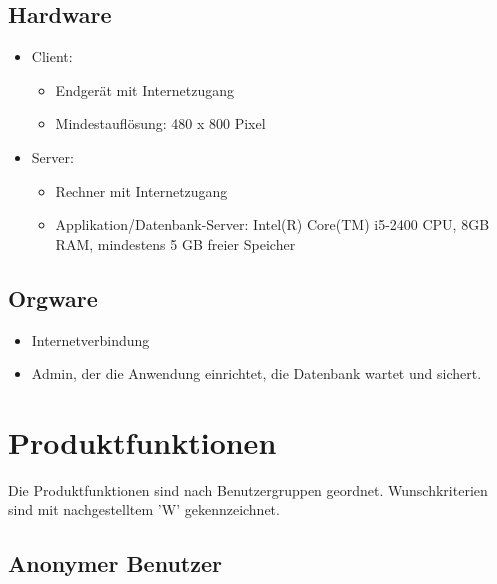 \documentclass[a4paper]{scrreprt}
\newcounter{Lc}
\newcounter{Hc}
\newcommand{\resetAllCounter}{\setcounter{Lc}{0}\setcounter{Hc}{1}}
\begin{document}
    \section{Hardware}   
        \begin{itemize}
          	\item Client:
	            \begin{itemize}
	            	\item Endgerät mit Internetzugang
	            	\item Mindestauflösung: 480 x 800 Pixel
	            \end{itemize}
          	\item Server:
	           \begin{itemize}
		           	\item Rechner mit Internetzugang
		           	\item Applikation/Datenbank-Server: Intel(R) Core(TM) i5-2400 CPU, 8GB
RAM, mindestens 5 GB freier Speicher
	           \end{itemize}
        \end{itemize}
        
     \section{Orgware}
             \begin{itemize}
               \item Internetverbindung
               \item \gls{Admin}, der die Anwendung einrichtet, die Datenbank wartet
und sichert.
             \end{itemize}

\resetAllCounter
\newcommand{\Func}[1]{\stepcounter{Lc}\textcolor{Blue}{\textbf{/F\arabic{Hc}0-\arabic{Lc}0/} #1} \\}
\newcommand{\FuncW}[1]{\stepcounter{Lc}\textcolor{Green}{\textbf{/F\arabic{Hc}0-\arabic{Lc}0W/} #1} \\}
\newcommand{\FuncBlue}[1]{\textcolor{Blue}{\textbf{#1}}}
\newcommand{\FuncGreen}[1]{\textcolor{Green}{\textbf{#1}}}

\chapter{Produktfunktionen}
Die Produktfunktionen sind nach Benutzergruppen geordnet. Wunschkriterien sind mit nachgestelltem 'W' gekennzeichnet.
	\section{Anonymer Benutzer}
\end{document}

